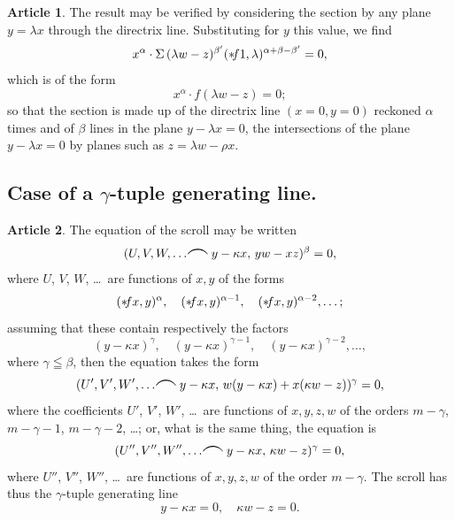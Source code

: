 \documentclass[12pt,a4paper]{article}
\theoremstyle{definition}
\newtheorem{art}{Article}[section]
\begin{document}
\begin{art}
The result may be verified by considering the section by any plane $y = \lambda x$ through the directrix line. Substituting for $y$ this value, we find
\[
x^\alpha \cdot \Sigma \, (\lambda w - z)^{\beta'} (* \hspace{-2pt} f1, \lambda)^{\alpha + \beta - \beta'} = 0,
\]
which is of the form
\[
x^\alpha \cdot f(\lambda w - z) = 0;
\]
so that the section is made up of the directrix line $(x = 0, y = 0)$ reckoned $\alpha$ times and of $\beta$ lines in the plane $y - \lambda x = 0$, the intersections of the plane $y - \lambda x = 0$ by planes such as $z = \lambda w - \rho x$.
\end{art}

\subsection*{Case of a $\gamma$-tuple generating line.}

\begin{art}
The equation of the scroll may be written
\[
(U, V, W, \ldots \hspace{-2pt} \resizebox{!}{1.5ex}{$\frown$} \hspace{2pt} y - \kappa x, \, yw - xz)^\beta = 0,
\]
where $U$, $V$, $W$, \ldots\ are functions of $x, y$ of the forms
\[
(* \hspace{-2pt} fx, y)^\alpha, \quad (* \hspace{-2pt} fx, y)^{\alpha-1}, \quad (* \hspace{-2pt} fx, y)^{\alpha-2}, \ldots;
\]
assuming that these contain respectively the factors
\[
(y - \kappa x)^\gamma, \quad (y - \kappa x)^{\gamma-1}, \quad (y - \kappa x)^{\gamma-2}, \ldots,
\]
where $\gamma \leqq \beta$, then the equation takes the form
\[
(U', V', W', \ldots \hspace{-2pt} \resizebox{!}{1.5ex}{$\frown$} \hspace{2pt} y - \kappa x, \, w(y - \kappa x) + x(\kappa w - z))^\gamma = 0,
\]
where the coefficients $U'$, $V'$, $W'$, \ldots\ are functions of $x, y, z, w$ of the orders $m - \gamma$, $m - \gamma - 1$, $m - \gamma - 2$, \ldots; or, what is the same thing, the equation is
\[
(U'', V'', W'', \ldots \hspace{-2pt} \resizebox{!}{1.5ex}{$\frown$} \hspace{2pt} y - \kappa x, \, \kappa w - z)^\gamma = 0,
\]
where $U''$, $V''$, $W''$, \ldots\ are functions of $x, y, z, w$ of the order $m - \gamma$. The scroll has thus the $\gamma$-tuple generating line
\[
y - \kappa x = 0, \quad \kappa w - z = 0.
\]
\end{art}
\end{document}
